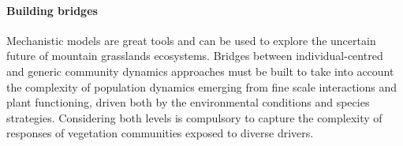 \paragraph{Building bridges}
Mechanistic models are great tools and can be used to explore the uncertain future of mountain grasslands ecosystems. Bridges between individual-centred and generic community dynamics approaches must be built to take into account the complexity of population dynamics emerging from fine scale interactions and plant functioning, driven both by the environmental conditions and species strategies. Considering both levels is compulsory to capture the complexity of responses of vegetation communities exposed to diverse drivers.

%
%
%

